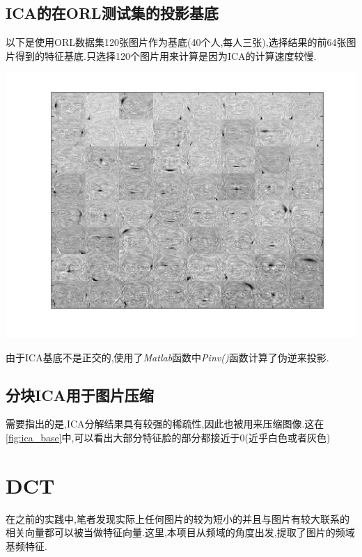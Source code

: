 \subsection{ICA的在ORL测试集的投影基底}
以下是使用ORL数据集120张图片作为基底(40个人,每人三张),选择结果的前64张图片得到的特征基底.只选择120个图片用来计算是因为ICA的计算速度较慢.
\begin{center}
\begin{minipage}[t]{\linewidth}
\center
{
\includegraphics[width=\textwidth]{Img/ica_base.png} 
\label{fig:ica_base}
}
\end{minipage}
\medskip
\end{center}
由于ICA基底不是正交的,使用了\textit{Matlab}函数中\textit{Pinv()}函数计算了伪逆来投影.

\subsection{分块ICA用于图片压缩}
需要指出的是,ICA分解结果具有较强的稀疏性,因此也被用来压缩图像.这在\ref{fig:ica_base}中,可以看出大部分特征脸的部分都接近于0(近乎白色或者灰色)


\section{DCT}
在之前的实践中,笔者发现实际上任何图片的较为短小的并且与图片有较大联系的相关向量都可以被当做特征向量.这里,本项目从频域的角度出发,提取了图片的频域基频特征.
